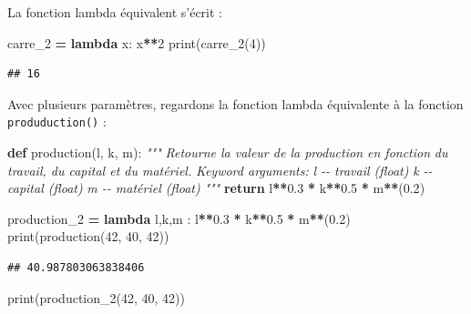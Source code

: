 \documentclass[
  12pt,
]{book}
\newenvironment{Shaded}{\begin{snugshade}}{\end{snugshade}}
\newcommand{\BuiltInTok}[1]{#1}
\newcommand{\CommentTok}[1]{\textcolor[rgb]{0.56,0.35,0.01}{\textit{#1}}}
\newcommand{\ControlFlowTok}[1]{\textcolor[rgb]{0.13,0.29,0.53}{\textbf{#1}}}
\newcommand{\DecValTok}[1]{\textcolor[rgb]{0.00,0.00,0.81}{#1}}
\newcommand{\FloatTok}[1]{\textcolor[rgb]{0.00,0.00,0.81}{#1}}
\newcommand{\KeywordTok}[1]{\textcolor[rgb]{0.13,0.29,0.53}{\textbf{#1}}}
\newcommand{\NormalTok}[1]{#1}
\newcommand{\OperatorTok}[1]{\textcolor[rgb]{0.81,0.36,0.00}{\textbf{#1}}}
\numberwithin{equation}{section}
\numberwithin{countremarque}{section}
\begin{document}
La fonction lambda équivalent s'écrit :

\begin{Shaded}
\begin{Highlighting}[]
\NormalTok{carre\_2 }\OperatorTok{=} \KeywordTok{lambda}\NormalTok{ x: x}\OperatorTok{**}\DecValTok{2}
\BuiltInTok{print}\NormalTok{(carre\_2(}\DecValTok{4}\NormalTok{))}
\end{Highlighting}
\end{Shaded}

\begin{lstlisting}
## 16
\end{lstlisting}

Avec plusieurs paramètres, regardons la fonction lambda équivalente à la fonction \texttt{produduction()} :

\begin{Shaded}
\begin{Highlighting}[]
\KeywordTok{def}\NormalTok{ production(l, k, m):}
  \CommentTok{"""}
\CommentTok{  Retourne la valeur de la production en fonction}
\CommentTok{  du travail, du capital et du matériel.}
\CommentTok{  }
\CommentTok{  Keyword arguments:}
\CommentTok{  l {-}{-} travail (float)}
\CommentTok{  k {-}{-} capital (float)}
\CommentTok{  m {-}{-} matériel (float)}
\CommentTok{  """}
  \ControlFlowTok{return}\NormalTok{ l}\OperatorTok{**}\FloatTok{0.3} \OperatorTok{*}\NormalTok{ k}\OperatorTok{**}\FloatTok{0.5} \OperatorTok{*}\NormalTok{ m}\OperatorTok{**}\NormalTok{(}\FloatTok{0.2}\NormalTok{)}
\end{Highlighting}
\end{Shaded}

\begin{Shaded}
\begin{Highlighting}[]
\NormalTok{production\_2 }\OperatorTok{=} \KeywordTok{lambda}\NormalTok{ l,k,m : l}\OperatorTok{**}\FloatTok{0.3} \OperatorTok{*}\NormalTok{ k}\OperatorTok{**}\FloatTok{0.5} \OperatorTok{*}\NormalTok{ m}\OperatorTok{**}\NormalTok{(}\FloatTok{0.2}\NormalTok{)}
\BuiltInTok{print}\NormalTok{(production(}\DecValTok{42}\NormalTok{, }\DecValTok{40}\NormalTok{, }\DecValTok{42}\NormalTok{))}
\end{Highlighting}
\end{Shaded}

\begin{lstlisting}
## 40.987803063838406
\end{lstlisting}

\begin{Shaded}
\begin{Highlighting}[]
\BuiltInTok{print}\NormalTok{(production\_2(}\DecValTok{42}\NormalTok{, }\DecValTok{40}\NormalTok{, }\DecValTok{42}\NormalTok{))}
\end{Highlighting}
\end{Shaded}
\end{document}
